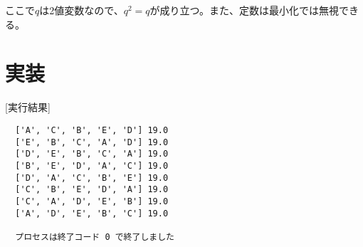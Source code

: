 ここで$q$は2値変数なので、$q^2=q$が成り立つ。また、定数は最小化では無視できる。

\section{実装}



[実行結果]\\

\begin{verbatim}
  ['A', 'C', 'B', 'E', 'D'] 19.0
  ['E', 'B', 'C', 'A', 'D'] 19.0
  ['D', 'E', 'B', 'C', 'A'] 19.0
  ['B', 'E', 'D', 'A', 'C'] 19.0
  ['D', 'A', 'C', 'B', 'E'] 19.0
  ['C', 'B', 'E', 'D', 'A'] 19.0
  ['C', 'A', 'D', 'E', 'B'] 19.0
  ['A', 'D', 'E', 'B', 'C'] 19.0

  プロセスは終了コード 0 で終了しました
\end{verbatim}

